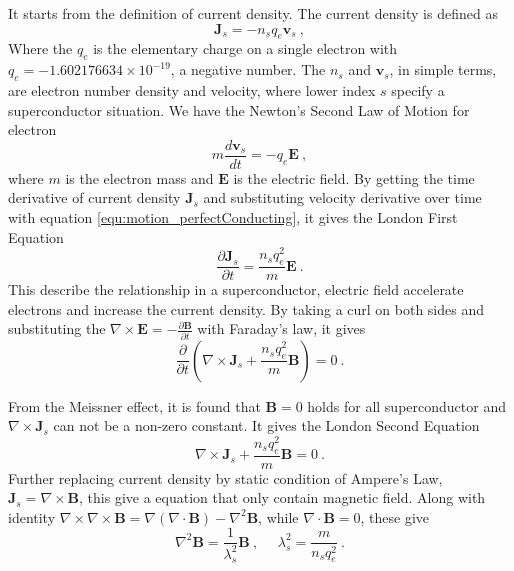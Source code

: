 It starts from the definition of current density. The current density is defined as 
$$
\mathbf{J}_s=-n_s q_e \mathbf{v}_s\ ,
$$
Where the $q_e$ is the elementary charge on a single electron with  $q_e=-1.602176634\times10^{-19}$, a negative number. The $n_s$ and $\mathbf{v}_s$, in simple terms, are electron number density and velocity, where lower index $s$ specify a superconductor situation. We have the Newton's Second Law of Motion for electron
\begin{equation}
m\frac{d\mathbf{v}_s}{dt}=-q_e\mathbf{E}\ ,
\label{equ:motion_perfectConducting}
\end{equation}
where $m$ is the electron mass and $\mathbf{E}$ is the electric field. By getting the time derivative of current density $\mathbf{J}_s$ and substituting velocity derivative over time with equation \ref{equ:motion_perfectConducting}, it gives the London First Equation
$$
\frac{\partial \mathbf{J}_s}{\partial t}=\frac{n_s q_e^2}{m}\mathbf{E}\ .
$$
This describe the relationship in a superconductor, electric field accelerate electrons and increase the current density. By taking a curl on both sides and substituting the $\nabla\times\mathbf{E}=-\frac{\partial \mathbf{B}}{\partial t}$ with Faraday's law, it gives
$$
\frac{\partial }{\partial t}\left(\nabla\times\mathbf{J}_s+\frac{n_s q_e^2}{m}\mathbf{B}\right)=0\ .
$$

From the Meissner effect, it is found that $\mathbf{B}=0$ holds for all superconductor and $\nabla\times\mathbf{J}_s$ can not be a non-zero constant. It gives the London Second Equation
$$
\nabla\times\mathbf{J}_s+\frac{n_s q_e^2}{m}\mathbf{B}=0\ .
$$
Further replacing current density by static condition of Ampere's Law, $\mathbf{J}_s=\nabla \times \mathbf{B}$, this give a equation that only contain magnetic field. Along with identity $\nabla\times\nabla\times\mathbf{B}=\nabla\left(\nabla\cdot\mathbf{B}\right)-\nabla^2\mathbf{B}$, while $\nabla\cdot\mathbf{B}=0$, these give \cite{london_equations_wikipedia} 
\begin{equation}
	\nabla^2\mathbf{B}=\frac{1}{\lambda_s^2}\mathbf{B}\ ,\ \ \ \ \ \  \lambda_s^2=\frac{m}{n_s q_e^2}\ .
	\label{equ:B_superconducting}
\end{equation}


